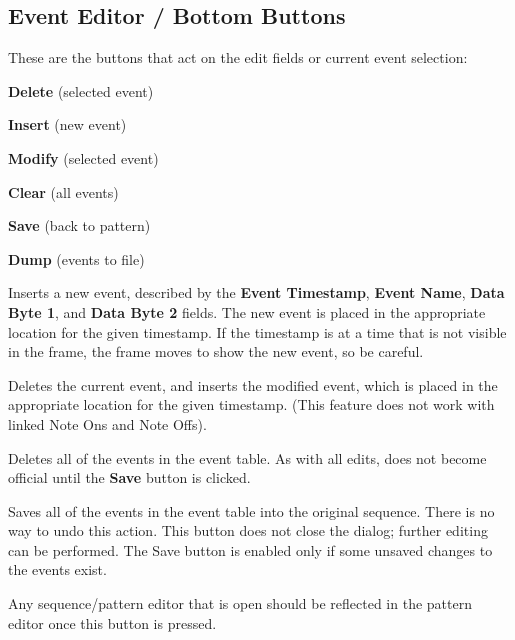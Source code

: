 \subsection{Event Editor / Bottom Buttons}
\label{subsec:event_editor_buttons}

   These are the buttons that act on the edit fields or current event
   selection:

   \begin{enumber}
      \item \textbf{Delete} (selected event)
      \item \textbf{Insert} (new event)
      \item \textbf{Modify} (selected event)
      \item \textbf{Clear} (all events)
      \item \textbf{Save} (back to pattern)
      \item \textbf{Dump} (events to file)
   \end{enumber}

   \setcounter{ItemCounter}{0}      %

   Inserts a new event, described by the 
   \textbf{Event Timestamp},
   \textbf{Event Name},
   \textbf{Data Byte 1}, and
   \textbf{Data Byte 2} fields.
   The new event is placed in the appropriate location for the given timestamp.
   If the timestamp is at a time that is not visible in the frame, the frame
   moves to show the new event, so be careful.

   Deletes the current event, and inserts the modified event,
   which is placed in the appropriate location for the given
   timestamp.  (This feature does not work with linked Note Ons and Note Offs).

   Deletes all of the events in the event table.
   As with all edits, does not become official until the \textbf{Save} button
   is clicked.

   Saves all of the events in the event table into the original sequence.
   There is no way to undo this action.
   This button does not close the dialog; further
   editing can be performed.  The Save button is enabled only if
   some unsaved changes to the events exist.

   Any sequence/pattern editor that is open should be reflected
   in the pattern editor once this button is pressed.

